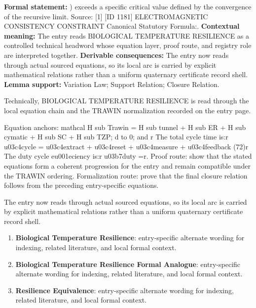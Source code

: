 \begingroup\footnotesize\setlength{\emergencystretch}{3em}\sloppy
\textbf{Formal statement:} ) exceeds a specific critical value defined by the convergence of the recursive limit. Source: [1] [ID 1181] ELECTROMAGNETIC CONSISTENCY CONSTRAINT Canonical Statutory Formula:. \textbf{Contextual meaning:} The entry reads BIOLOGICAL TEMPERATURE RESILIENCE as a controlled technical headword whose equation layer, proof route, and registry role are interpreted together. \textbf{Derivable consequences:} The entry now reads through actual sourced equations, so its local arc is carried by explicit mathematical relations rather than a uniform quaternary certificate record shell. \textbf{Lemma support:} Variation Law; Support Relation; Closure Relation.\par
\endgroup

Technically, BIOLOGICAL TEMPERATURE RESILIENCE is read through the local equation chain and the TRAWIN normalization recorded on the entry page.

Equation anchors: mathcal H sub Trawin = H sub tunnel + H sub ER + H sub cymatic + H sub SC + H sub TZP; d to 0; and r The total cycle time is:r u03c4cycle = u03c4extract + u03c4reset + u03c4measure + u03c4feedback (72)r The duty cycle eu001eciency is:r u03b7duty =r. Proof route: show that the stated equations form a coherent progression for the entry and remain compatible under the TRAWIN ordering. Formalization route: prove that the final closure relation follows from the preceding entry-specific equations.

The entry now reads through actual sourced equations, so its local arc is carried by explicit mathematical relations rather than a uniform quaternary certificate record shell.
\endgroup

\begin{enumerate}[leftmargin=1.6em,itemsep=6pt,topsep=4pt]
\item \textbf{Biological Temperature Resilience}: entry-specific alternate wording for indexing, related literature, and local formal context.
\item \textbf{Biological Temperature Resilience Formal Analogue}: entry-specific alternate wording for indexing, related literature, and local formal context.
\item \textbf{Resilience Equivalence}: entry-specific alternate wording for indexing, related literature, and local formal context.
\end{enumerate}

